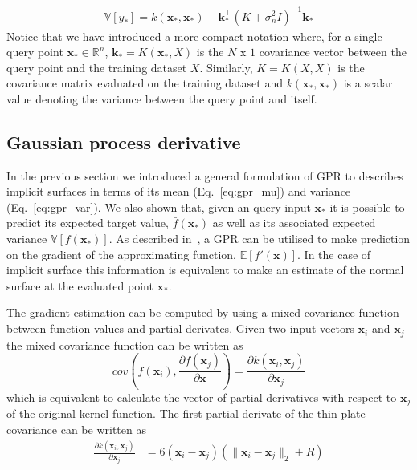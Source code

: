 \begin{eqnarray}
\label{eq:gpr_var}
\mathbb{V}[y_*]=k(\mathbf{x}_*,\mathbf{x}_*)-\mathbf{k}_*^\top(K+\sigma_n^2I)^{-1}\mathbf{k}_*
\end{eqnarray}
Notice that we have introduced a more compact notation where, for a single query point $\mathbf{x}_*\in\mathbb{R}^n$, $\mathbf{k}_*=K(\mathbf{x}_*,X)$ is the $N\text{ x }1$ covariance vector between the query point and the training dataset $X$. Similarly, $K=K(X,X)$ is the covariance matrix evaluated on the training dataset and $k(\mathbf{x}_*,\mathbf{x}_*)$ is a scalar value denoting the variance between the query point and itself.

\subsection{Gaussian process derivative}
\label{sec:gpr_der}

In the previous section we introduced a general formulation of GPR to describes implicit surfaces in terms of its mean (Eq.~\ref{eq:gpr_mu}) and variance (Eq.~\ref{eq:gpr_var}). We also shown that, given an query input $\mathbf{x}_*$ it is possible to predict its expected target value, $\bar{f}(\mathbf{x}_*)$ as well as its associated expected variance $\mathbb{V}[f(\mathbf{x}_*)]$. As described in~\cite{Rasmussen2006Gaussian}, a GPR can be utilised to make prediction on the gradient of the approximating function, $\mathbb{E}[f'(\mathbf{x})]$. In the case of implicit surface this information is equivalent to make an estimate of the normal surface at the evaluated point $\mathbf{x}_*$.

The gradient estimation can be computed by using a mixed covariance function between function values and partial derivates. Given two input vectors $\mathbf{x}_i$ and $\mathbf{x}_j$ the mixed covariance function can be written as
$$
cov(f(\mathbf{x}_i), \frac{\partial f(\mathbf{x}_j)}{\partial\mathbf{x}})=\frac{\partial k(\mathbf{x}_i, \mathbf{x}_j)}{\partial\mathbf{x}_j}
$$
which is equivalent to calculate the vector of partial derivatives with respect to $\mathbf{x}_j$ of the original kernel function. The first partial derivate of the thin plate covariance can be written as
\begin{eqnarray}
\label{eq:gpr_der} 
\frac{\partial k(\mathbf{x}_i,\mathbf{x}_j)}{\partial\mathbf{x}_j}&=6(\mathbf{x}_i-\mathbf{x}_j)(\|\mathbf{x}_i-\mathbf{x}_j\|_2 + R)
\end{eqnarray}

